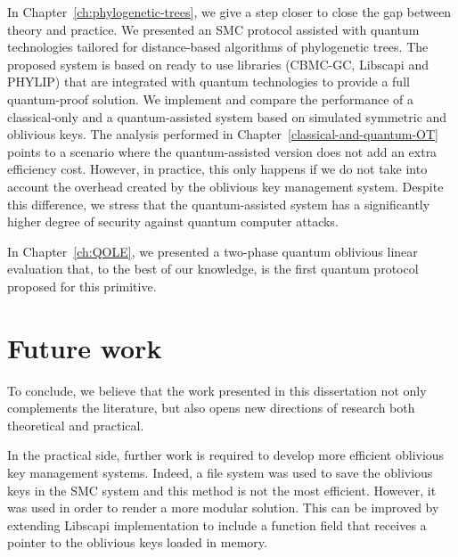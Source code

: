 In Chapter~\ref{ch:phylogenetic-trees}, we give a step closer to close the gap between theory and practice. We presented an SMC protocol assisted with quantum technologies tailored for distance-based algorithms of phylogenetic trees. The proposed system is based on ready to use libraries (CBMC-GC, Libscapi and PHYLIP) that are integrated with quantum technologies to provide a full quantum-proof solution. We implement and compare the performance of a classical-only and a quantum-assisted system based on simulated symmetric and oblivious keys. The analysis performed in Chapter~\ref{classical-and-quantum-OT} points to a scenario where the quantum-assisted version does not add an extra efficiency cost. However, in practice, this only happens if we do not take into account the overhead created by the oblivious key management system. Despite this difference, we stress that the quantum-assisted system has a significantly higher degree of security against quantum computer attacks.

In Chapter~\ref{ch:QOLE}, we presented a two-phase quantum oblivious linear evaluation that, to the best of our knowledge, is the first quantum protocol proposed for this primitive.

\section{Future work}

To conclude, we believe that the work presented in this dissertation not only complements the literature, but also opens new directions of research both theoretical and practical.

In the practical side, further work is required to develop more efficient oblivious key management systems. Indeed, a file system was used to save the oblivious keys in the SMC system and this method is not the most efficient. However, it was used in order to render a more modular solution. This can be improved by extending Libscapi implementation to include a function field that receives a pointer to the oblivious keys loaded in memory. 

